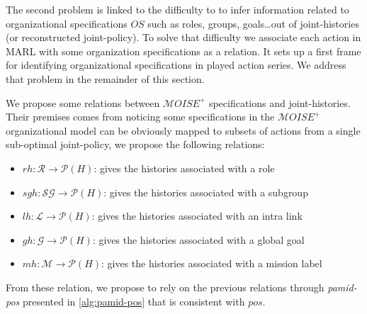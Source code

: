\documentclass[runningheads]{llncs}
\newcounter{relation}
\begin{document}
The second problem is linked to the difficulty to to infer information related to organizational specifications $OS$ such as roles, groups, goals\dots out of joint-histories (or reconstructed joint-policy).
To solve that difficulty we associate each action in MARL with some organization specifications as a  relation. It sets up a first frame for identifying organizational specifications in played action series. We address that problem in the remainder of this section.

We propose some relations between $\mathcal{M}OISE^+$ specifications and joint-histories. Their premises comes from noticing some specifications in the $\mathcal{M}OISE^+$ organizational model can be obviously mapped to subsets of actions from a single sub-optimal joint-policy, we propose the following relations:

\begin{itemize}
    \item $rh: \mathcal{R} \rightarrow \mathcal{P}(H)$: gives the histories associated with a role
    \item $sgh: \mathcal{SG} \rightarrow \mathcal{P}(H)$: gives the histories associated with a subgroup
    \item $lh: \mathcal{L} \rightarrow \mathcal{P}(H)$: gives the histories associated with an intra link
    \item $gh: \mathcal{G} \rightarrow \mathcal{P}(H)$: gives the histories associated with a global goal
    \item $mh: \mathcal{M} \rightarrow \mathcal{P}(H)$: gives the histories associated with a mission label
\end{itemize}

From these relation, we propose to rely on the previous relations through \emph{pamid-pos} presented in \autoref{alg:pamid-pos} that is consistent with $pos$.

\end{document}
